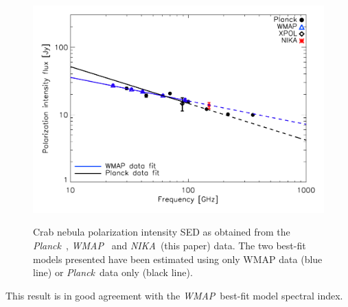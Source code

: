 \documentclass[twocolumn,traditabstract]{aa}
\def\NIKA{\textit{NIKA}}
\def\Planck{\textit{Planck}}
\def\WMAP{\textit{WMAP}}
\begin{document}
\begin{figure}
  \centering
             { \includegraphics[width=1\linewidth,keepaspectratio]{figures/Crab_SED_ipol.pdf}}
           \caption{Crab nebula polarization intensity SED as obtained from the \Planck\ \citep{2015arXiv150702058P}, \WMAP\ \citep{2011ApJS..192...19W} and \NIKA\ (this paper) data. The two best-fit models presented have been estimated using only WMAP data (blue line) or \Planck\ data only (black line).}
\label{crab_SED_ipol}		
  \end{figure} 
 \noindent
This result is in good agreement with the \WMAP\ best-fit model spectral index.


\end{document}
